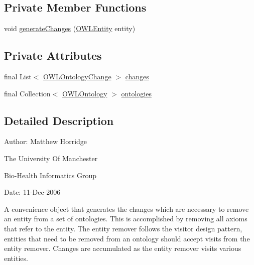 \subsection*{Private Member Functions}
\begin{DoxyCompactItemize}
\item 
void \hyperlink{classorg_1_1semanticweb_1_1owlapi_1_1util_1_1_o_w_l_entity_remover_a4cfe857fc3a62c23cbc2fc065d6367d1}{generate\-Changes} (\hyperlink{interfaceorg_1_1semanticweb_1_1owlapi_1_1model_1_1_o_w_l_entity}{O\-W\-L\-Entity} entity)
\end{DoxyCompactItemize}
\subsection*{Private Attributes}
\begin{DoxyCompactItemize}
\item 
final List$<$ \hyperlink{classorg_1_1semanticweb_1_1owlapi_1_1model_1_1_o_w_l_ontology_change}{O\-W\-L\-Ontology\-Change} $>$ \hyperlink{classorg_1_1semanticweb_1_1owlapi_1_1util_1_1_o_w_l_entity_remover_a4e0ce7551f3bbefe7f96f1681503c12f}{changes}
\item 
final Collection$<$ \hyperlink{interfaceorg_1_1semanticweb_1_1owlapi_1_1model_1_1_o_w_l_ontology}{O\-W\-L\-Ontology} $>$ \hyperlink{classorg_1_1semanticweb_1_1owlapi_1_1util_1_1_o_w_l_entity_remover_a49abe27183ac14719a0def399db5981c}{ontologies}
\end{DoxyCompactItemize}


\subsection{Detailed Description}
Author\-: Matthew Horridge\par
 The University Of Manchester\par
 Bio-\/\-Health Informatics Group\par
 Date\-: 11-\/\-Dec-\/2006\par
\par
 

A convenience object that generates the changes which are necessary to remove an entity from a set of ontologies. This is accomplished by removing all axioms that refer to the entity. The entity remover follows the visitor design pattern, entities that need to be removed from an ontology should accept visits from the entity remover. Changes are accumulated as the entity remover visits various entities. 

